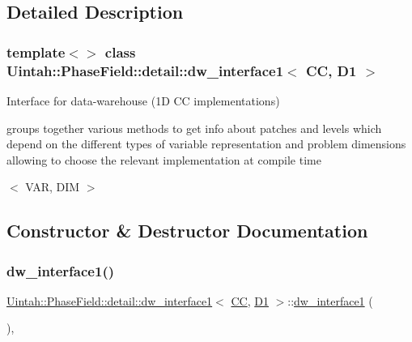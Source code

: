 \subsection{Detailed Description}
\subsubsection*{template$<$$>$\newline
class Uintah\+::\+Phase\+Field\+::detail\+::dw\+\_\+interface1$<$ C\+C, D1 $>$}

Interface for data-\/warehouse (1D CC implementations) 

groups together various methods to get info about patches and levels which depend on the different types of variable representation and problem dimensions allowing to choose the relevant implementation at compile time

$<$ V\+AR, D\+IM $>$ 

\subsection{Constructor \& Destructor Documentation}
\mbox{\label{classUintah_1_1PhaseField_1_1detail_1_1dw__interface1_3_01CC_00_01D1_01_4_ae3e286b0e3d96012eef3335f7c59ad17}} 
\subsubsection{\texorpdfstring{dw\+\_\+interface1()}{dw\_interface1()}\hspace{0.1cm}{\footnotesize\ttfamily [1/2]}}
{\footnotesize\ttfamily \hyperlink{classUintah_1_1PhaseField_1_1detail_1_1dw__interface1}{Uintah\+::\+Phase\+Field\+::detail\+::dw\+\_\+interface1}$<$ \hyperlink{namespaceUintah_1_1PhaseField_a33d355affda78a83f45755ba8388cedda22303704507d024d1d6508ed9859a85a}{CC}, \hyperlink{namespaceUintah_1_1PhaseField_a12bfc68444894dffdf0cb8d9cf0cc76aa24dcc0ba6bcb45bc6f503b1b538c6809}{D1} $>$\+::\hyperlink{classUintah_1_1PhaseField_1_1detail_1_1dw__interface1}{dw\+\_\+interface1} (\begin{DoxyParamCaption}{ }\end{DoxyParamCaption})\hspace{0.3cm}{\ttfamily [protected]}, {\ttfamily [delete]}}



